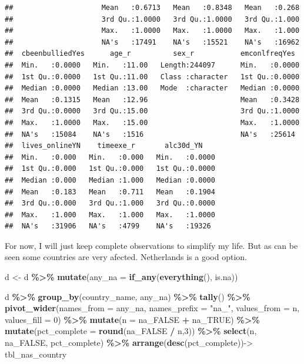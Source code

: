 \documentclass[
]{article}
\newenvironment{Shaded}{\begin{snugshade}}{\end{snugshade}}
\newcommand{\AttributeTok}[1]{\textcolor[rgb]{0.13,0.29,0.53}{#1}}
\newcommand{\DecValTok}[1]{\textcolor[rgb]{0.00,0.00,0.81}{#1}}
\newcommand{\FunctionTok}[1]{\textcolor[rgb]{0.13,0.29,0.53}{\textbf{#1}}}
\newcommand{\NormalTok}[1]{#1}
\newcommand{\OtherTok}[1]{\textcolor[rgb]{0.56,0.35,0.01}{#1}}
\newcommand{\SpecialCharTok}[1]{\textcolor[rgb]{0.81,0.36,0.00}{\textbf{#1}}}
\newcommand{\StringTok}[1]{\textcolor[rgb]{0.31,0.60,0.02}{#1}}
\begin{document}
\begin{verbatim}
##                     Mean   :0.6713   Mean   :0.8348   Mean   :0.268  
##                     3rd Qu.:1.0000   3rd Qu.:1.0000   3rd Qu.:1.000  
##                     Max.   :1.0000   Max.   :1.0000   Max.   :1.000  
##                     NA's   :17491    NA's   :15521    NA's   :16962  
##  cbeenbulliedYes      age_r          sex_r           emconlfreqYes   
##  Min.   :0.0000   Min.   :11.00   Length:244097      Min.   :0.0000  
##  1st Qu.:0.0000   1st Qu.:11.00   Class :character   1st Qu.:0.0000  
##  Median :0.0000   Median :13.00   Mode  :character   Median :0.0000  
##  Mean   :0.1315   Mean   :12.96                      Mean   :0.3428  
##  3rd Qu.:0.0000   3rd Qu.:15.00                      3rd Qu.:1.0000  
##  Max.   :1.0000   Max.   :15.00                      Max.   :1.0000  
##  NA's   :15084    NA's   :1516                       NA's   :25614   
##  lives_onlineYN    timeexe_r       alc30d_YN     
##  Min.   :0.000   Min.   :0.000   Min.   :0.0000  
##  1st Qu.:0.000   1st Qu.:0.000   1st Qu.:0.0000  
##  Median :0.000   Median :1.000   Median :0.0000  
##  Mean   :0.183   Mean   :0.711   Mean   :0.1904  
##  3rd Qu.:0.000   3rd Qu.:1.000   3rd Qu.:0.0000  
##  Max.   :1.000   Max.   :1.000   Max.   :1.0000  
##  NA's   :31906   NA's   :4799    NA's   :19326
\end{verbatim}

For now, I will just keep complete observations to simplify my life. But
as can be seen some countries are very afected. Netherlands is a good
option.

\begin{Shaded}
\begin{Highlighting}[]
\NormalTok{d }\OtherTok{\textless{}{-}}\NormalTok{ d }\SpecialCharTok{\%\textgreater{}\%} 
  \FunctionTok{mutate}\NormalTok{(}\AttributeTok{any\_na =} \FunctionTok{if\_any}\NormalTok{(}\FunctionTok{everything}\NormalTok{(), is.na))}

\NormalTok{d }\SpecialCharTok{\%\textgreater{}\%}
  \FunctionTok{group\_by}\NormalTok{(country\_name, any\_na) }\SpecialCharTok{\%\textgreater{}\%}
  \FunctionTok{tally}\NormalTok{() }\SpecialCharTok{\%\textgreater{}\%}
  \FunctionTok{pivot\_wider}\NormalTok{(}\AttributeTok{names\_from =}\NormalTok{ any\_na,}
              \AttributeTok{names\_prefix =} \StringTok{"na\_"}\NormalTok{,}
              \AttributeTok{values\_from =}\NormalTok{ n,}
              \AttributeTok{values\_fill =} \DecValTok{0}\NormalTok{) }\SpecialCharTok{\%\textgreater{}\%}
  \FunctionTok{mutate}\NormalTok{(}\AttributeTok{n =}\NormalTok{ na\_FALSE }\SpecialCharTok{+}\NormalTok{ na\_TRUE) }\SpecialCharTok{\%\textgreater{}\%}
  \FunctionTok{mutate}\NormalTok{(}\AttributeTok{pct\_complete =} \FunctionTok{round}\NormalTok{(na\_FALSE }\SpecialCharTok{/}\NormalTok{ n,}\DecValTok{3}\NormalTok{)) }\SpecialCharTok{\%\textgreater{}\%}
  \FunctionTok{select}\NormalTok{(n, na\_FALSE, pct\_complete) }\SpecialCharTok{\%\textgreater{}\%}
  \FunctionTok{arrange}\NormalTok{(}\FunctionTok{desc}\NormalTok{(pct\_complete))}\OtherTok{{-}\textgreater{}}\NormalTok{ tbl\_nas\_country}
\end{Highlighting}
\end{Shaded}
\end{document}
